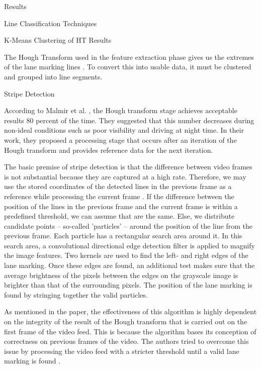 \documentclass{matthijs}
\begin{document}
\begin{hoofdstuk}{Results}
\begin{paragraaf}{Line Classification Techniques}
			\begin{subparagraaf}{K-Means Clustering of HT Results}

				The Hough Transform used in the feature extraction phase gives us the extremes of the lane marking lines \cite{gupta2016automated}.
				To convert this into usable data, it must be clustered and grouped into line segments.

			\end{subparagraaf}

			\begin{subparagraaf}{Stripe Detection}

				According to Malmir et al. \cite{malmir2019design}, the Hough transform stage achieves acceptable results 80 percent of the time.
				They suggested that this number decreases during non-ideal conditions such as poor visibility and driving at night time.
				In their work, they proposed a processing stage that occurs after an iteration of the Hough transform and provides reference data for the next iteration.

				\bigskip

				The basic premise of stripe detection is that the difference between video frames is not substantial because they are captured at a high rate.
				Therefore, we may use the stored coordinates of the detected lines in the previous frame as a reference while processing the current frame \cite{malmir2019design}.
				If the difference between the position of the lines in the previous frame and the current frame is within a predefined threshold, we can assume that are the same.
				Else, we distribute candidate points -- so-called 'particles' -- around the position of the line from the previous frame.
				Each particle has a rectangular search area around it.
				In this search area, a convolutional directional edge detection filter is applied to magnify the image features.
				Two kernels are used to find the left- and right edges of the lane marking.
				Once these edges are found, an additional test makes sure that the average brightness of the pixels between the edges on the grayscale image is brighter than that of the surrounding pixels.
				The position of the lane marking is found by stringing together the valid particles.

				\bigskip

				As mentioned in the paper, the effectiveness of this algorithm is highly dependent on the integrity of the result of the Hough transform that is carried out on the first frame of the video feed.
				This is because the algorithm bases its conception of correctness on previous frames of the video.
				The authors tried to overcome this issue by processing the video feed with a stricter threshold until a valid lane marking is found \cite{malmir2019design}.


\end{subparagraaf}
\end{paragraaf}
\end{hoofdstuk}
\end{document}
